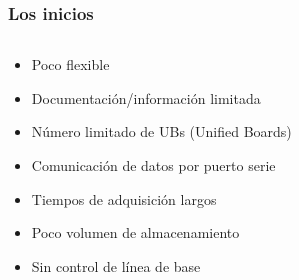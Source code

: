 \documentclass{beamer}
\begin{document}

\begin{frame}
	\frametitle{Los inicios}
				\color[rgb]{0.2,0.2,0.9}{Electrónica dedicada para Auger}
				\begin{columns}
			\begin{column}{0.50\textwidth}
				\begin{block}{}
		    	\begin{itemize}
		      	\item Poco flexible 
		      	\item Documentación/información limitada
		      	\item Número limitado de UBs (Unified Boards)
						\item Comunicación de datos por puerto serie
						\item	Tiempos de adquisición largos
						\item	Poco volumen de almacenamiento
						\item Sin control de línea de base	
		    	\end{itemize}
				\end{block}
			\end{column} 
		 	\begin{column}{0.50\textwidth}
		 \end{column}
		\end{columns}
\end{frame} 
\end{document}
